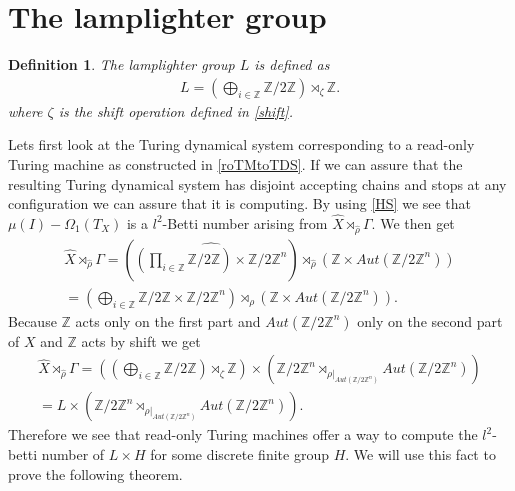 \documentclass[12pt,a4paper]{scrartcl}
\newtheorem{Definition}[Theorem]{Definition}
\numberwithin{equation}{section}
\newcommand{\Z}{\mathbb{Z}} %
\newcommand{\2}{\mathbb{Z} / 2 \mathbb{Z}}
\newcommand{\1}{\overline{1}}
\newcommand{\0}{\overline{0}}
\begin{document}
\section{The lamplighter group}
\begin{Definition}
	The lamplighter group $L$ is defined as
	\begin{align*}
		L = (\bigoplus_{i \in \Z} \2) \rtimes_{\zeta} \Z.
	\end{align*}
	where $\zeta$ is the shift operation defined in \ref{shift}.
\end{Definition}
Lets first look at the Turing dynamical system corresponding to a read-only Turing machine as constructed in \ref{roTMtoTDS}. If we can assure that the resulting Turing dynamical system has disjoint accepting chains and stops at any configuration we can assure that it is computing. By using \ref{HS} we see that $\mu (I) - \Omega_1(T_X)$ is a $l^2$-Betti number arising from $\hat{X} \rtimes_{\hat{\rho}} \Gamma$. We then get
\begin{align*}
	\hat{X} \rtimes_{\hat{\rho}} \Gamma = (\widehat{(\prod_{i \in \Z} \2) \times \2^n}) \rtimes_{\hat{\rho}} (\Z \times Aut(\2^n)) \\
	= (\bigoplus_{i \in \Z} \2 \times \2^n) \rtimes_{\rho} (\Z \times Aut(\2^n)).
\end{align*}
Because $\Z$ acts only on the first part and $Aut(\2^n)$ only on the second part of $X$ and $\Z$ acts by shift we get
\begin{align*}
	\hat{X} \rtimes_{\hat{\rho}} \Gamma = ((\bigoplus_{i \in \Z} \2) \rtimes_{\zeta} \Z) \times (\2^n \rtimes_{\rho|_{Aut(\2^n)}} Aut(\2^n)) \\
	= L \times (\2^n \rtimes_{\rho|_{Aut(\2^n)}} Aut(\2^n)).
\end{align*}
Therefore we see that read-only Turing machines offer a way to compute the $l^2$-betti number of $L \times H$ for some discrete finite group $H$. We will use this fact to prove the following theorem.
\end{document}
